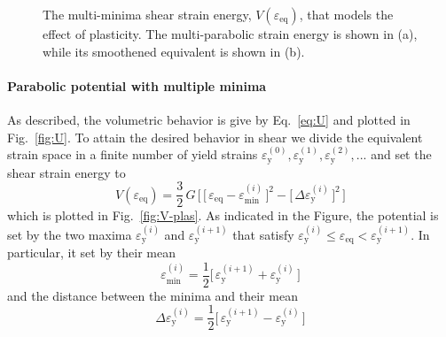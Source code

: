 \documentclass[times,namecite]{goose-article}
\begin{document}
\begin{figure}[htp]
\begin{minipage}[t]{.49\textwidth}
    \label{fig:V-plas-smooth}
  \end{minipage}
  \caption{The multi-minima shear strain energy, $V ( \varepsilon_\mathrm{eq} )$, that models the effect of plasticity. The multi-parabolic strain energy is shown in (a), while its smoothened equivalent is shown in (b).}
\end{figure}

\paragraph{Parabolic potential with multiple minima}

As described, the volumetric behavior is give by Eq.~\eqref{eq:U} and plotted in Fig.~\ref{fig:U}. To attain the desired behavior in shear we divide the equivalent strain space in a finite number of yield strains $\varepsilon_\mathrm{y}^{(0)}, \varepsilon_\mathrm{y}^{(1)}, \varepsilon_\mathrm{y}^{(2)}, ...$ and set the shear strain energy to
\begin{equation}\label{eq:V-plas}
  V ( \varepsilon_\mathrm{eq} )
  =
  \frac{3}{2} \, G \, \bigg[\, \Big[\, \varepsilon_\mathrm{eq} - \varepsilon_\mathrm{min}^{(i)} \,\Big]^2 - \Big[\, \Delta \varepsilon_\mathrm{y}^{(i)} \,\Big]^2 \,\bigg]
\end{equation}
which is plotted in Fig.~\ref{fig:V-plas}. As indicated in the Figure, the potential is set by the two maxima $\varepsilon_\mathrm{y}^{(i)}$ and $\varepsilon_\mathrm{y}^{(i+1)}$ that satisfy $\varepsilon_\mathrm{y}^{(i)} \leq \varepsilon_\mathrm{eq} < \varepsilon_\mathrm{y}^{(i+1)}$. In particular, it set by their mean
\begin{equation}
  \varepsilon_\mathrm{min}^{(i)}
  =
  \frac{1}{2} \Big[\, \varepsilon_\mathrm{y}^{(i+1)} + \varepsilon_\mathrm{y}^{(i)} \,\Big]
\end{equation}
and the distance between the minima and their mean
\begin{equation}
  \Delta \varepsilon_\mathrm{y}^{(i)}
  =
  \frac{1}{2} \Big[\, \varepsilon_\mathrm{y}^{(i+1)} - \varepsilon_\mathrm{y}^{(i)} \,\Big]
\end{equation}
\end{document}
